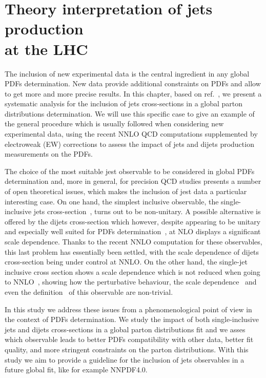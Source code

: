 \chapter{Theory interpretation of jets production \\ at the LHC}
\label{ch:jets}
The inclusion of new experimental data is the central ingredient in any global PDFs determination.
New data provide additional constraints on PDFs and allow to get more and more precise results. 
In this chapter, based on ref.~\cite{AbdulKhalek:2020jut}, we present a systematic analysis for the inclusion 
of jets cross-sections in a global parton distributions determination.
We will use this specific case to give an example of the general procedure which is usually followed 
when considering new experimental data, using the recent NNLO QCD computations
supplemented by electroweak (EW) corrections to assess the impact of jets and dijets production measurements on the PDFs. 

% 
The choice of the most suitable jest observable to be considered in global PDFs determination and, more in general,
for precision QCD studies presents a number of open theoretical issues, which makes the inclusion of
jest data a particular interesting case.
On one hand, the simplest inclusive observable, 
the single-inclusive jets cross-section~\cite{Ellis:1990ek,Aversa:1988fv}, turns out to be non-unitary.
A possible alternative is offered by the dijets cross-section which however, despite appearing to be 
unitary and especially well suited for PDFs determination~\cite{Giele:1994xd}, at NLO displays a significant scale dependence. 
Thanks to the recent NNLO computation for these observables, this last problem has essentially been settled,
with the scale dependence of dijets cross-section being under control at NNLO.
On the other hand, the single-jet inclusive cross section
shows a scale dependence which is not reduced when going to NNLO~\cite{Currie:2017ctp}, 
showing how the perturbative behaviour, the scale dependence~\cite{Currie:2018xkj} and even the definition~\cite{Cacciari:2019qjx} 
of this observable are non-trivial.  

%
In this study we address these issues from a phenomenological point of view in the context of PDFs determination. 
We study the impact of both single-inclusive
jets and dijets cross-sections in a global parton distributions fit and we
asses which observable leads to better PDFs compatibility with other data, better fit quality,
and more stringent constraints on the parton distributions. 
With this study we aim to provide a guideline for the inclusion of jets observables in a future global fit,
like for example NNPDF4.0.

